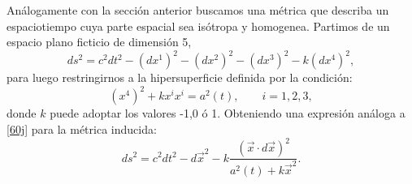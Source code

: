 Análogamente con la sección anterior buscamos una métrica que describa un espaciotiempo cuya parte espacial sea isótropa y homogenea. Partimos de un espacio plano ficticio de dimensión 5,
\begin{equation}
 ds^{2}= c^2dt^2 -(dx^{1})^{2}-(dx^{2})^{2}-(dx^{3})^{2}-k(dx^{4})^{2},
 \end{equation}
para luego restringirnos a la hipersuperficie definida por la condición:
 \begin{equation}\label{60k}
(x^{4})^{2} +kx^{i}x^{i}=a^{2}(t),\qquad i=1,2,3, 
  \end{equation}
donde $k$ puede adoptar los valores -1,0 ó 1. Obteniendo una expresión análoga a \eqref{60j} para la métrica inducida:
\begin{equation}\label{60kk}
ds^{2}= c^2dt^2 - d\vec{x}^{2} - k\frac{(\vec{x}\cdot d\vec{x})^{2}}{a^{2}(t)+k\vec{x}^{2}}. 
\end{equation}

